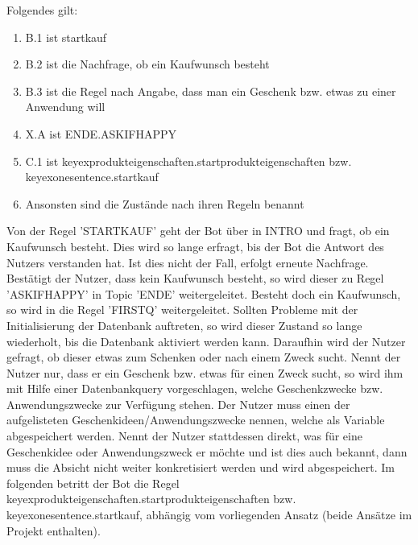 Folgendes gilt:

\begin{enumerate}
\item{B.1 ist startkauf}
\item{B.2 ist die Nachfrage, ob ein Kaufwunsch besteht}
\item{B.3 ist die Regel nach Angabe, dass man ein Geschenk bzw. etwas zu einer Anwendung will}
\item{X.A ist ENDE.ASKIFHAPPY}
\item{C.1 ist keyexprodukteigenschaften.startprodukteigenschaften bzw. keyexonesentence.startkauf}
\item{Ansonsten sind die Zustände nach ihren Regeln benannt}
\end{enumerate}

Von der Regel 'STARTKAUF' geht der Bot über in INTRO und fragt, ob ein Kaufwunsch besteht. Dies wird so lange erfragt, bis der Bot die Antwort des Nutzers verstanden hat. 
Ist dies nicht der Fall, erfolgt erneute Nachfrage. Bestätigt der Nutzer, dass kein Kaufwunsch besteht, so wird dieser zu Regel 'ASKIFHAPPY' in Topic 'ENDE' weitergeleitet. Besteht doch ein Kaufwunsch, so wird in die Regel 'FIRSTQ' weitergeleitet. Sollten Probleme mit der Initialisierung der Datenbank auftreten, so wird dieser Zustand so lange wiederholt, bis die Datenbank aktiviert werden kann. 
Daraufhin wird der Nutzer gefragt, ob dieser etwas zum Schenken oder nach einem Zweck sucht. Nennt der Nutzer nur, dass er ein Geschenk bzw. etwas für einen Zweck sucht, so wird ihm mit Hilfe einer Datenbankquery vorgeschlagen, welche Geschenkzwecke bzw. Anwendungszwecke zur Verfügung stehen. Der Nutzer muss einen der aufgelisteten Geschenkideen/Anwendungszwecke nennen, welche als Variable abgespeichert werden. Nennt der Nutzer stattdessen direkt, was für eine Geschenkidee oder Anwendungszweck er möchte und ist dies auch bekannt, dann muss die Absicht nicht weiter konkretisiert werden und wird abgespeichert. 
Im folgenden betritt der Bot die Regel keyexprodukteigenschaften.startprodukteigenschaften bzw. keyexonesentence.startkauf, abhängig vom vorliegenden Ansatz (beide Ansätze im Projekt enthalten). 

